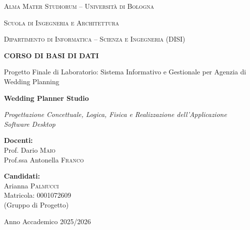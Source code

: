 \documentclass[11pt,a4paper,titlepage]{report}
\begin{document}
\begin{titlepage}
    \centering
    {\scshape\Large Alma Mater Studiorum -- Università di Bologna \par}
    \vspace{0.4cm}
    {\scshape\large Scuola di Ingegneria e Architettura \par}
    {\scshape\small Dipartimento di Informatica -- Scienza e Ingegneria (DISI) \par}
    \vspace{1.2cm}
    
    \vspace{1.5cm}
    
    {\Large\bfseries CORSO DI BASI DI DATI\par}
    \vspace{0.4cm}
    {\Large Progetto Finale di Laboratorio: Sistema Informativo e Gestionale per Agenzia di Wedding Planning \par}
    \vspace{0.8cm}
    {\huge\bfseries\color{uniboRed} Wedding Planner Studio \par}
    {\large\itshape Progettazione Concettuale, Logica, Fisica e Realizzazione dell'Applicazione Software Desktop \par}
    
    \vspace{2.2cm}
    
    \begin{minipage}{0.48\textwidth}
        \begin{flushleft} \large
            \textbf{Docenti:}\\
            Prof. Dario \textsc{Maio}\\
            Prof.ssa Antonella \textsc{Franco}
        \end{flushleft}
    \end{minipage}
    \hfill
    \begin{minipage}{0.48\textwidth}
        \begin{flushright} \large
            \textbf{Candidati:}\\
            Arianna \textsc{Palmucci} \\
            Matricola: 0001072609 \\
            (Gruppo di Progetto)
        \end{flushright}
    \end{minipage}
    
    \vfill
    {\large Anno Accademico 2025/2026 \par}
\end{titlepage}
\end{document}

